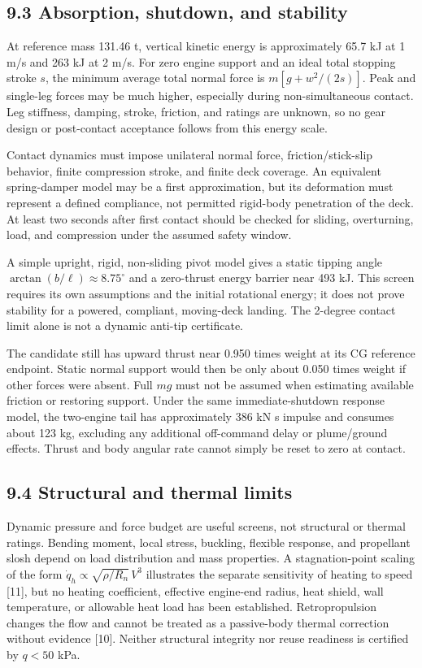 \documentclass[
  11pt,
  a4paper,
]{article}
\begin{document}
\subsection{9.3 Absorption, shutdown, and
stability}\label{absorption-shutdown-and-stability}

At reference mass 131.46 t, vertical kinetic energy is approximately
65.7 kJ at 1 m/s and 263 kJ at 2 m/s. For zero engine support and an
ideal total stopping stroke \(s\), the minimum average total normal
force is \(m[g+w^2/(2s)]\). Peak and single-leg forces may be much
higher, especially during non-simultaneous contact. Leg stiffness,
damping, stroke, friction, and ratings are unknown, so no gear design or
post-contact acceptance follows from this energy scale.

Contact dynamics must impose unilateral normal force,
friction/stick-slip behavior, finite compression stroke, and finite deck
coverage. An equivalent spring-damper model may be a first
approximation, but its deformation must represent a defined compliance,
not permitted rigid-body penetration of the deck. At least two seconds
after first contact should be checked for sliding, overturning, load,
and compression under the assumed safety window.

A simple upright, rigid, non-sliding pivot model gives a static tipping
angle \(\arctan(b/\ell)\approx8.75^\circ\) and a zero-thrust energy
barrier near 493 kJ. This screen requires its own assumptions and the
initial rotational energy; it does not prove stability for a powered,
compliant, moving-deck landing. The 2-degree contact limit alone is not
a dynamic anti-tip certificate.

The candidate still has upward thrust near 0.950 times weight at its CG
reference endpoint. Static normal support would then be only about 0.050
times weight if other forces were absent. Full \(mg\) must not be
assumed when estimating available friction or restoring support. Under
the same immediate-shutdown response model, the two-engine tail has
approximately 386 kN s impulse and consumes about 123 kg, excluding any
additional off-command delay or plume/ground effects. Thrust and body
angular rate cannot simply be reset to zero at contact.

\subsection{9.4 Structural and thermal
limits}\label{structural-and-thermal-limits}

Dynamic pressure and force budget are useful screens, not structural or
thermal ratings. Bending moment, local stress, buckling, flexible
response, and propellant slosh depend on load distribution and mass
properties. A stagnation-point scaling of the form
\(\dot q_h\propto\sqrt{\rho/R_n}\,V^3\) illustrates the separate
sensitivity of heating to speed {[}11{]}, but no heating coefficient,
effective engine-end radius, heat shield, wall temperature, or allowable
heat load has been established. Retropropulsion changes the flow and
cannot be treated as a passive-body thermal correction without evidence
{[}10{]}. Neither structural integrity nor reuse readiness is certified
by \(q<50\) kPa.
\end{document}
